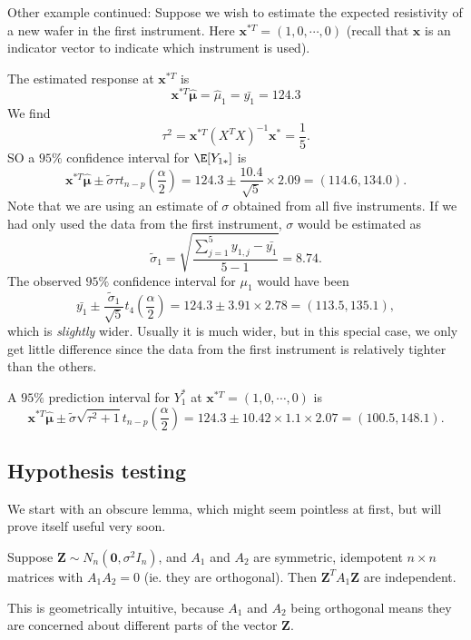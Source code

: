 \documentclass[a4paper]{article}
\begin{document}
\begin{eg}
  Other example continued: Suppose we wish to estimate the expected resistivity of a new wafer in the first instrument. Here $\mathbf{x}^{*T} = (1, 0, \cdots, 0)$ (recall that $\mathbf{x}$ is an indicator vector to indicate which instrument is used).

  The estimated response at $\mathbf{x}^{*T}$ is
  \[
    \mathbf{x}^{*T}\hat{\boldsymbol\mu} = \hat{\mu}_1 = \bar{y_1} = 124.3
  \]
  We find
  \[
    \tau^2 = \mathbf{x}^{*T}(X^TX)^{-1}\mathbf{x}^* = \frac{1}{5}.
  \]
  SO a $95\%$ confidence interval for $\E[Y_{1*}]$ is
  \[
    \mathbf{x}^{*T}\hat{\boldsymbol\mu}\pm \tilde{\sigma}\tau t_{n - p}\left(\frac{\alpha}{2}\right) = 124.3 \pm \frac{10.4}{\sqrt{5}}\times 2.09 = (114.6, 134.0).
  \]
  Note that we are using an estimate of $\sigma$ obtained from all five instruments. If we had only used the data from the first instrument, $\sigma$ would be estimated as
  \[
    \tilde{\sigma}_1 = \sqrt{ \frac{\sum_{j = 1}^5y_{1,j} - \bar{y_1}}{5 - 1}} = 8.74.
  \]
  The observed $95\%$ confidence interval for $\mu_1$ would have been
  \[
    \bar {y_1} \pm \frac{\tilde{\sigma}_1}{\sqrt{5}}t_4\left(\frac{\alpha}{2}\right) = 124.3\pm 3.91\times 2.78 = (113.5, 135.1),
  \]
  which is \emph{slightly} wider. Usually it is much wider, but in this special case, we only get little difference since the data from the first instrument is relatively tighter than the others.

  A $95\%$ prediction interval for $Y_1^*$ at $\mathbf{x}^{*T} = (1, 0, \cdots, 0)$ is
  \[
    \mathbf{x}^{*T} \hat{\boldsymbol\mu} \pm \tilde{\sigma}\sqrt{\tau^2 + 1} t_{n - p}\left(\frac{\alpha}{2}\right) = 124.3 \pm 10.42 \times 1.1\times 2.07 = (100.5, 148.1).
  \]
\end{eg}
\subsection{Hypothesis testing}
We start with an obscure lemma, which might seem pointless at first, but will prove itself useful very soon.
\begin{lemma}
  Suppose $\mathbf{Z} \sim N_n(\mathbf{0}, \sigma^2 I_n)$, and $A_1$ and $A_2$ are symmetric, idempotent $n\times n$ matrices with $A_1A_2 = 0$ (ie. they are orthogonal). Then $\mathbf{Z}^T A_1 \mathbf{Z}$ are independent.
\end{lemma}
This is geometrically intuitive, because $A_1$ and $A_2$ being orthogonal means they are concerned about different parts of the vector $\mathbf{Z}$.
\end{document}
